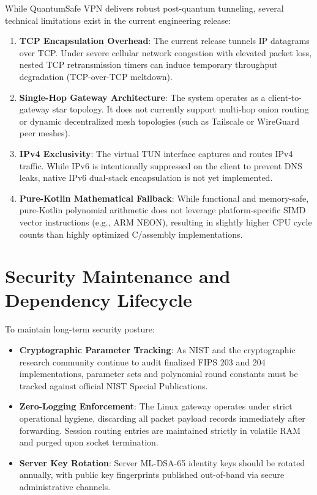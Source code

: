 While QuantumSafe VPN delivers robust post-quantum tunneling, several technical limitations exist in the current engineering release:

\begin{enumerate}
    \item \textbf{TCP Encapsulation Overhead}: The current release tunnels IP datagrams over TCP. Under severe cellular network congestion with elevated packet loss, nested TCP retransmission timers can induce temporary throughput degradation (TCP-over-TCP meltdown).
    \item \textbf{Single-Hop Gateway Architecture}: The system operates as a client-to-gateway star topology. It does not currently support multi-hop onion routing or dynamic decentralized mesh topologies (such as Tailscale or WireGuard peer meshes).
    \item \textbf{IPv4 Exclusivity}: The virtual TUN interface captures and routes IPv4 traffic. While IPv6 is intentionally suppressed on the client to prevent DNS leaks, native IPv6 dual-stack encapsulation is not yet implemented.
    \item \textbf{Pure-Kotlin Mathematical Fallback}: While functional and memory-safe, pure-Kotlin polynomial arithmetic does not leverage platform-specific SIMD vector instructions (e.g., ARM NEON), resulting in slightly higher CPU cycle counts than highly optimized C/assembly implementations.
\end{enumerate}

\section{Security Maintenance and Dependency Lifecycle}
\label{sec:security_maintenance}

To maintain long-term security posture:
\begin{itemize}
    \item \textbf{Cryptographic Parameter Tracking}: As NIST and the cryptographic research community continue to audit finalized FIPS 203 and 204 implementations, parameter sets and polynomial round constants must be tracked against official NIST Special Publications.
    \item \textbf{Zero-Logging Enforcement}: The Linux gateway operates under strict operational hygiene, discarding all packet payload records immediately after forwarding. Session routing entries are maintained strictly in volatile RAM and purged upon socket termination.
    \item \textbf{Server Key Rotation}: Server ML-DSA-65 identity keys should be rotated annually, with public key fingerprints published out-of-band via secure administrative channels.
\end{itemize}
